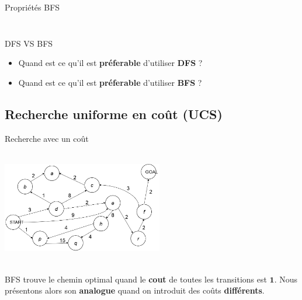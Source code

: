 \documentclass{beamer}
\begin{document}
\begin{frame}[t]{Propriétés BFS}
\begin{columns}
\begin{column}{0.5\textwidth}
\begin{figure}[htpb]
\begin{center}
     \end{center}
     \end{figure}
   \end{column}
 \end{columns} 
\end{frame}


\begin{frame}[t]{DFS VS BFS}
   \vspace*{2cm}
  \begin{itemize}
  \large
\item Quand est ce qu'il est \textbf{\alert{préferable}} d'utiliser \textbf{DFS}
  ?\\[1cm]
\item Quand est ce qu'il est \textbf{\alert{préferable}} d'utiliser \textbf{BFS}
  ?
  \end{itemize}
\end{frame}
\subsection{Recherche uniforme en coût (UCS)}%
\label{sub:recherche_uniforme_en_cout_ucs_}

\begin{frame}[t]{Recherche avec un coût}
 \begin{center}
   \includegraphics[width=7cm,height=5cm]{./images/cost_sensitive_search.png}
 \end{center}

 \begin{block}{}
   BFS trouve le chemin optimal quand le \textbf{cout} de toutes les transitions
   est $\mathbf{1}$. Nous présentons alors son \textbf{analogue} quand on
   introduit des coûts \textbf{\alert{différents}}. 
 \end{block}
\end{frame}
\end{document}
